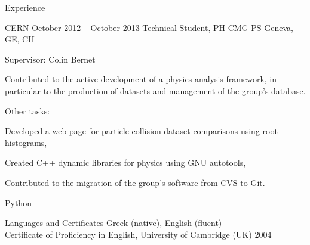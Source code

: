 \documentclass{resume}
\begin{document}
\begin{rSection}{Experience}
\begin{rSubsection}
  {CERN}
  {October 2012 -- October 2013}
  {Technical Student, PH-CMG-PS}
  {Geneva, GE, CH}
\item Supervisor: Colin Bernet
  \item Contributed to the active development of a physics analysis framework,
  in particular to the production of datasets and management of the
  group's database.
\item Other tasks: \\
  \begin{inparaenum}[(i)]
  \item Developed a web page for particle collision dataset comparisons using root histograms, \\
  \item Created C++ dynamic libraries for physics using GNU autotools, \\
  \item Contributed to the migration of the group's software from CVS to Git.
  \end{inparaenum}
  \footnotesize\textcolor{MyColor}{Python}
\end{rSubsection}

\end{rSection}

\begin{rSection}{Languages and Certificates}
  Greek (native), English (fluent) \\
  Certificate of Proficiency in English, University of Cambridge (UK)
  \hfill 2004
\end{rSection}


\end{document}
